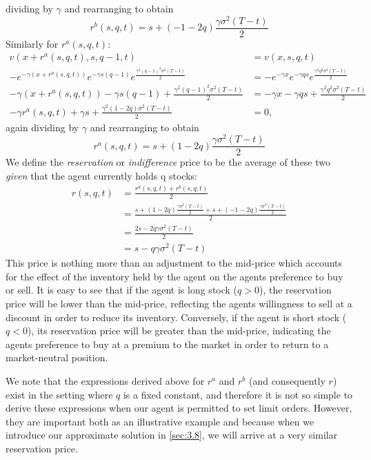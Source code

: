 dividing by $\gamma$ and rearranging to obtain
\begin{equation}
    r^b(s,q,t)=s+(-1-2q)\frac{\gamma\sigma^2(T-t)}{2}
\end{equation}
Similarly for $r^a(s,q,t)$:
\begin{align*}
    v(x+r^a(s,q,t),s,q-1,t)&=v(x,s,q,t)\\
    -e^{-\gamma(x+r^a(s,q,t))}e^{-\gamma s(q-1)}e^{\frac{\gamma^2(q-1)^2\sigma^2(T-t)}{2}}&=-e^{-\gamma x}e^{-\gamma q s}e^{\frac{\gamma^2q^2\sigma^2(T-t)}{2}}\\
    -\gamma(x+r^a(s,q,t))-\gamma s(q-1)+\frac{\gamma^2(q-1)^2\sigma^2(T-t)}{2}&=-\gamma x-\gamma q s + \frac{\gamma^2q^2\sigma^2(T-t)}{2}\\
    -\gamma r^a(s,q,t) + \gamma s + \frac{\gamma^2(1-2q)\sigma^2(T-t)}{2}&=0,
\end{align*}
again dividing by $\gamma$ and rearranging to obtain
\begin{equation}
    r^a(s,q,t)=s+(1-2q)\frac{\gamma\sigma^2(T-t)}{2}
\end{equation}
We define the \emph{reservation} or \emph{indifference} price to be the average of 
these two \textit{given} that the agent currently holds q stocks:
\begin{align*}
    r(s,q,t)&=\frac{r^a(s,q,t)+r^b(s,q,t)}{2}\\
    &=\frac{s+(1-2q)\frac{\gamma\sigma^2(T-t)}{2}+s+(-1-2q)\frac{\gamma\sigma^2(T-t)}{2}}{2}\\
    &=\frac{2s-2q\gamma\sigma^2(T-t)}{2}\\
    &=s-q\gamma\sigma^2(T-t)
\end{align*}
This price is nothing more than an adjustment to the mid-price which accounts for the 
effect of the inventory held by the agent on the agents preference to buy or sell. It
is easy to see that if the agent is long stock ($q>0$), the reservation price will be 
lower than the mid-price, reflecting the agents willingness to sell at a discount in 
order to reduce its inventory. Conversely, if the agent is short stock ($q<0$), its 
reservation price will be greater than the mid-price, indicating the agents preference
to buy at a premium to the market in order to return to a market-neutral position.

We note that the expressions derived above for $r^a$ and $r^b$ (and consequently $r$)
exist in the setting where $q$ is a fixed constant, and therefore it is not so simple
to derive these expressions when our agent is permitted to set limit orders. However,
they are important both as an illustrative example and because when we introduce our 
approximate solution in \ref{sec:3.8}, we will arrive at a very similar reservation price.


